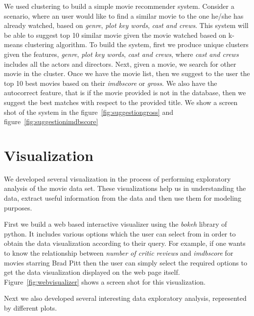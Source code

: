 \documentclass{article}%
\begin{document}
We used clustering to build a simple movie recommender system. Consider a scenario, where an user would like to find a similar movie to the one he/she has already watched, based on \textit{genre}, \textit{plot key words}, \textit{cast and crews}. This system will be able to suggest top 10 similar movie given the movie watched based on k-means clustering algorithm. 
To build the system, first we produce unique clusters given the features, \textit{genre}, \textit{plot key words}, \textit{cast and crews}, where \textit{cast and crews} includes all the actors and directors. Next, given a movie, we search for other movie in the cluster. Once we have the movie list, then we suggest to the user the top 10 best movies based on their \textit{imdbscore} or \textit{gross}. We also have the autocorrect feature, that is if the movie provided is not in the database, then we suggest the best matches with respect to the provided title. 
We show a screen shot of the system in the figure~\ref{fig:suggestiongross} and figure~\ref{fig:suggestionimdbscore} 


\section{Visualization}

We developed several visualization in the process of performing exploratory analysis of the movie data set. These visualizations help us in understanding the data, extract useful information from the data and then use them for modeling purposes. 

First we build a web based interactive visualizer using the \textit{bokeh} library of python. It includes various options which the user can select from in order to obtain the data visualization according to their query. For example, if one wants to know the relationship between \textit{number of critic reviews} and \textit{imdbscore} for movies starring Brad Pitt then the  user can simply select the required options to get the data visualization displayed on the web page itself. Figure~\ref{fig:webvisualizer} shows a screen shot for this visualization. 

Next we also developed several interesting data exploratory analysis, represented by different plots. 
\end{document}
